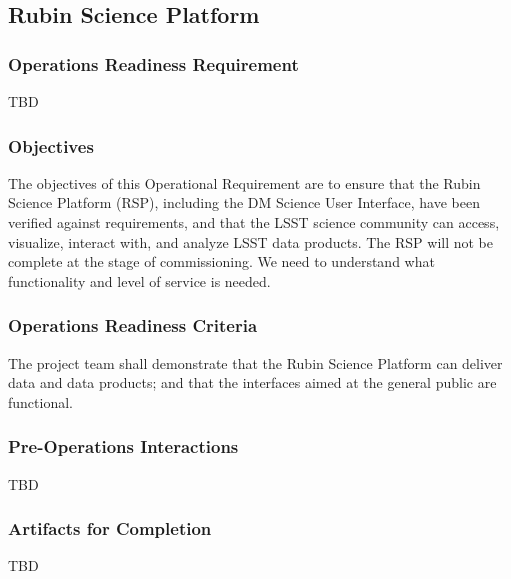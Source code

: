 \subsection{Rubin Science Platform}

\subsubsection{Operations Readiness Requirement}
TBD

\subsubsection{Objectives} 
The objectives of this Operational Requirement are to ensure that the Rubin Science Platform (RSP), including the DM Science User Interface, have been verified against requirements, and that the LSST science community can access, visualize, interact with, and analyze LSST data products. The RSP will not be complete at the stage of commissioning.  We need to understand what functionality and level of service is needed.

\subsubsection{Operations Readiness Criteria}
The project team shall demonstrate that the Rubin Science Platform can deliver data and data products; and that the interfaces aimed at the general public are functional.

\subsubsection{Pre-Operations Interactions}
TBD

\subsubsection{Artifacts for Completion}
TBD
